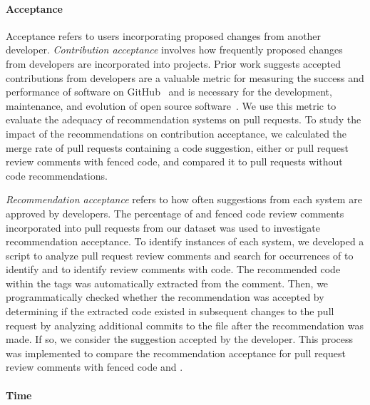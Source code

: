 

\paragraph*{Acceptance}

Acceptance refers to users incorporating proposed changes from another developer. \textit{Contribution acceptance} involves how frequently proposed changes from developers are incorporated into projects. Prior work suggests accepted contributions from developers are a valuable metric for measuring the success and performance of software on GitHub~\cite{mcdonald2013performance} and is necessary for the development, maintenance, and evolution of open source software~\cite{Middleton2018Contributions}. We use this metric to evaluate the adequacy of recommendation systems on pull requests. To study the impact of the recommendations on contribution acceptance, we calculated the merge rate of pull requests containing a code suggestion, either \sugg or pull request review comments with fenced code, and compared it to pull requests without code recommendations. %

\textit{Recommendation acceptance} refers to how often suggestions from each system are approved by developers. The percentage of \sugg and fenced code review comments incorporated into pull requests from our dataset was used to investigate recommendation acceptance. To identify instances of each system, we developed a script to analyze pull request review comments and search for occurrences of \suggtag to identify \sugg and \fence to identify review comments with code. The recommended code within the tags was automatically extracted from the comment. Then, we programmatically checked whether the recommendation was accepted by determining if the extracted code existed in subsequent changes to the pull request by analyzing additional commits to the file after the recommendation was made. If so, we consider the suggestion accepted by the developer. This process was implemented to compare the recommendation acceptance for pull request review comments with fenced code and \sugg.

\paragraph*{Time}

